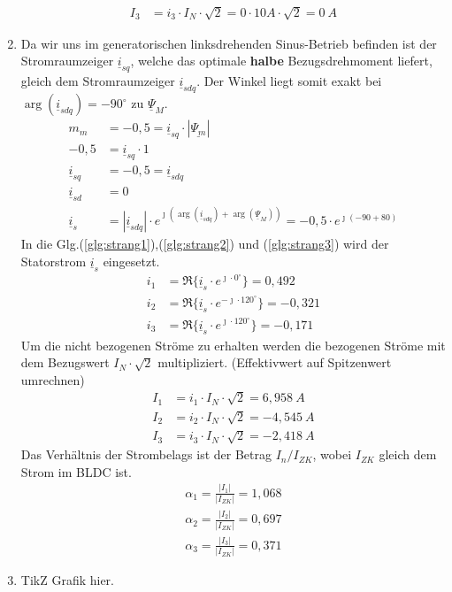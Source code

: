 \begin{solution}
\begin{enumerate}
\begin{align}
I_3 & = i_3 \cdot I_N \cdot \sqrt{2} =0 \cdot 10 A \cdot \sqrt{2} =0~A
\end{align}
\item Da wir uns im generatorischen linksdrehenden Sinus-Betrieb befinden ist der Stromraumzeiger $\underline{i}_{sq}$, welche das optimale \textbf{halbe} Bezugsdrehmoment liefert, gleich dem Stromraumzeiger $\underline{i}_{sdq}$. Der Winkel liegt somit exakt bei $\arg(\underline{i}_{sdq})=-90^\circ$ zu $\underline{\Psi}_M$.
\begin{align}
m_m &= -0,5 = \underline{i}_{sq} \cdot |\underline{\Psi_m}|\\
-0,5 &= \underline{i}_{sq} \cdot 1\\
\underline{i}_{sq} &= -0,5 = \underline{i}_{sdq} \\
\underline{i}_{sd} &= 0\\
\underline{i}_{s} &= |\underline{i}_{sdq}| \cdot e^{\jmath (\arg(\underline{i}_{sdq}) + \arg(\underline{\Psi}_{M}))}= -0,5 \cdot e^{\jmath (-90 + 80)}
\end{align}
In die Glg.(\ref{glg:strang1}),(\ref{glg:strang2}) und (\ref{glg:strang3}) wird der Statorstrom $\underline{i}_s$ eingesetzt.
\begin{align}
i_1 & = \Re \{ \underline{i}_s \cdot e^{\jmath \cdot 0 ^\circ} \} = 0,492\\
i_2 & = \Re \{ \underline{i}_s \cdot e^{-\jmath \cdot 120 ^\circ} \} = -0,321 \\
i_3 & = \Re \{ \underline{i}_s \cdot e^{\jmath \cdot 120 ^\circ} \}=  -0,171
\end{align}
Um die nicht bezogenen Ströme zu erhalten werden die bezogenen Ströme mit dem Bezugswert $I_N \cdot \sqrt{2}$ multipliziert. (Effektivwert auf Spitzenwert umrechnen)
\begin{align}
I_1 & = i_1 \cdot I_N \cdot \sqrt{2}  =6,958~A \\
I_2 & = i_2 \cdot I_N \cdot \sqrt{2} =-4,545~A \\
I_3 & = i_3 \cdot I_N \cdot \sqrt{2} =-2,418~A
\end{align}
Das Verh\"altnis der Strombelags ist der Betrag $I_n/ I_{ZK}$, wobei $I_{ZK}$ gleich dem Strom im BLDC ist.
\begin{align}
\alpha_1 = \frac{|I_1|}{|I_{ZK}|}= 1,068\\
\alpha_2 = \frac{|I_2|}{|I_{ZK}|}= 0,697\\
\alpha_3 = \frac{|I_3|}{|I_{ZK}|}= 0,371
\end{align}
\item TikZ Grafik hier.

\end{enumerate}
\end{solution}
